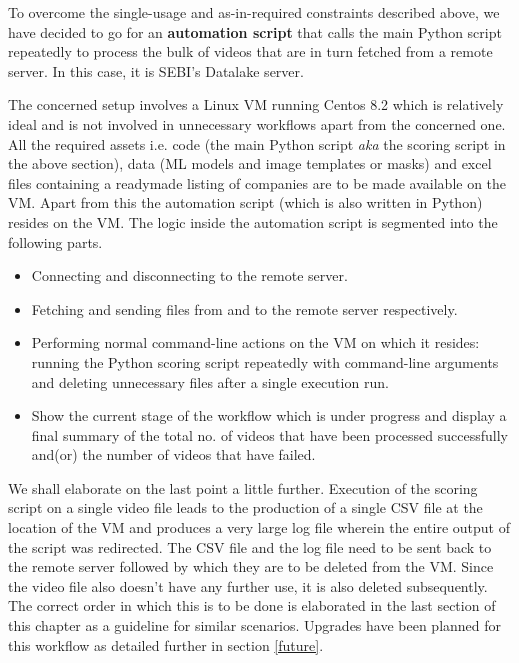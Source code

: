 To overcome the single-usage and as-in-required constraints described
above, we have decided to go for an \textbf{automation script} that
calls the main Python script repeatedly to process the bulk of videos
that are in turn fetched from a remote server. In this case, it is
SEBI’s Datalake server. \par

The concerned setup involves a Linux VM running Centos 8.2 which is
relatively ideal and is not involved in unnecessary workflows apart
from the concerned one. All the required assets i.e. code (the main
Python script \textit{aka} the scoring script in the above section),
data (ML models and image templates or masks) and excel files
containing a readymade listing of companies are to be made available
on the VM. Apart from this the automation script (which is also
written in Python) resides on the VM. The logic inside the automation
script is segmented into the following parts.

\begin{itemize}
  \item Connecting and disconnecting to the remote server.
  \item Fetching and sending files from and to the remote server respectively.
  \item Performing normal command-line actions on the VM on which it
    resides: running the Python scoring script repeatedly with
    command-line arguments and deleting unnecessary files after a
    single execution run.
  \item Show the current stage of the workflow which is under
    progress and display a final summary of the total no. of videos
    that have been processed successfully and(or) the number of
    videos that have failed.

\end{itemize}

We shall elaborate on the last point a little further. Execution of
the scoring script on a single video file leads to the production of
a single CSV file at the location of the VM and produces a very large
log file wherein the entire output of the script was redirected. The
CSV file and the log file need to be sent back to the remote server
followed by which they are to be deleted from the VM. Since the video
file also doesn’t have any further use, it is also deleted
subsequently. The correct order in which this is to be done is
elaborated in the last section of this chapter as a guideline for
similar scenarios. Upgrades have been planned for this workflow as
detailed further in section \ref{future}.

